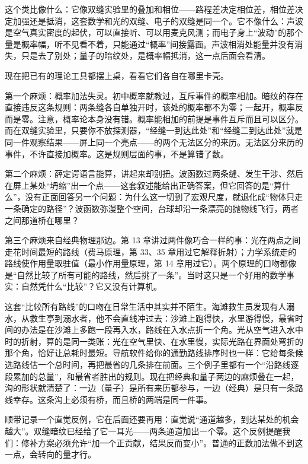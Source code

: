 这个类比像什么：它像双缝实验里的叠加和相位——路程差决定相位差，相位差决定加强还是抵消，这套数学和光的双缝、电子的双缝是同一个。它不像什么：声波是空气真实密度的起伏，可以直接听、可以用麦克风测；而电子身上“波动”的那个量是概率幅，听不见看不着，只能通过“概率”间接露面。声波相消处能量并没有消失，只是去了别处；量子的暗纹处，是概率幅抵消，这一点后面会看清。


现在把已有的理论工具都摆上桌，看看它们各自在哪里卡壳。

第一个麻烦：概率加法失灵。初中概率就教过，互斥事件的概率相加。暗纹的存在直接违反这条规则：两条缝各自单独开时，该处的概率都不为零；一起开，概率反而是零。注意，概率论本身没有错。概率能相加的前提是事件互斥而且可以区分。而在双缝实验里，只要你不放探测器，“经缝一到达此处”和“经缝二到达此处”就是同一件观察结果——屏上同一个亮点——的两个无法区分的来历。无法区分来历的事件，不许直接加概率。这是规则层面的事，不是算错了数。

第二个麻烦：薛定谔语言能算，讲起来却别扭。波函数过两条缝、发生干涉、然后在屏上某处“坍缩”出一个点——这套叙述能给出正确答案，但它回答的是“算什么”，没有正面回答另一个问题：为什么这一切到了宏观尺度，就退化成“物体只走一条确定的路径”？波函数弥漫整个空间，台球却沿一条漂亮的抛物线飞行，两者之间那道桥在哪里？

第三个麻烦来自经典物理那边。第 13 章讲过两件像巧合一样的事：光在两点之间走花时间最短的路线（费马原理，第 33、35 章用过它解释折射）；力学系统走的路线使作用量取驻值（最小作用量原理，第 14 章用过它）。两个原理的口吻都像是“自然比较了所有可能的路线，然后挑了一条”。当时这只是一个好用的数学事实：自然凭什么“比较”？它又没有计算机。

这套“比较所有路线”的口吻在日常生活中其实并不陌生。海滩救生员发现有人溺水，从救生亭到溺水者，他不会直线冲过去：沙滩上跑得快，水里游得慢，最省时间的办法是在沙滩上多跑一段再入水，路线在入水点折一个角。光从空气进入水中时的折射，算的是同一类账：光在空气里快、在水里慢，实际光路在界面处弯折的那个角，恰好让总耗时最短。导航软件给你的通勤路线排序时也一样：它给每条候选路线估一个总时间，再把最省的几条排在前面。三个例子里都有一个“沿路线逐段累加的总量”，和最省者胜出的规则。现在把经典和量子两边的麻烦叠在一起，沟的形状就清楚了：一边（量子）是所有来历都参与，一边（经典）是只有一条路线幸存。这条沟上必须有桥，而且桥的两端是同一件事。

顺带记录一个直觉反例，它在后面还要再用：直觉说“通道越多，到达某处的机会越大”。双缝暗纹已经给了它一耳光——两条通道加出一个零。这个反例提醒我们：修补方案必须允许“加一个正贡献，结果反而变小”。普通的正数加法做不到这一点，会转向的量才行。

